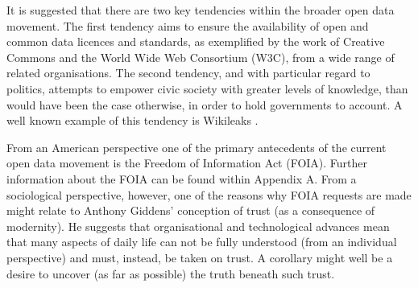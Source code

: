 It is suggested that there are two key tendencies within the broader open data movement.
The first tendency aims to ensure the availability of open and common data licences and standards, as exemplified by the work of Creative Commons \cite{creative-commons} and the World Wide Web Consortium \cite{w3c} (W3C), from a wide range of related organisations.
The second tendency, and with particular regard to politics, attempts to empower civic society with greater levels of knowledge, than would have been the case otherwise, in order to hold governments to account.
A well known example of this tendency is Wikileaks \cite{wikileaks}.  

From an American perspective one of the primary antecedents of the current open data movement is the Freedom of Information Act \cite{foia} (FOIA). Further information about the FOIA can be found within Appendix A.
From a sociological perspective, however, one of the reasons why FOIA requests are made might relate to Anthony Giddens' conception of trust \cite{anthony-giddens-consequences-of-modernity} (as a consequence of modernity).
He suggests that organisational and technological advances mean that many aspects of daily life can not be fully understood (from an individual perspective)
and must, instead, be taken on trust.
A corollary might well be a desire to uncover (as far as possible) the truth beneath such trust.